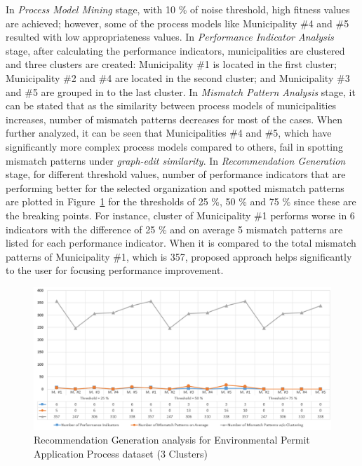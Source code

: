 In \textit{Process Model Mining} stage, with 10 \% of noise threshold, high fitness values are achieved; however, some of the process models like Municipality \#4 and \#5 resulted with low appropriateness values. In \textit{Performance Indicator Analysis} stage, after calculating the performance indicators, municipalities are clustered and three clusters are created: Municipality \#1 is located in the first cluster; Municipality \#2 and \#4 are located in the second cluster; and Municipality \#3 and \#5 are grouped in to the last cluster. In \textit{Mismatch Pattern Analysis} stage, it can be stated that as the similarity between process models of municipalities increases, number of mismatch patterns decreases for most of the cases. When further analyzed, it can be seen that Municipalities \#4 and \#5, which have significantly more complex process models compared to others, fail in spotting mismatch patterns under \textit{graph-edit similarity}. In \textit{Recommendation Generation} stage, for different threshold values, number of performance indicators that are performing better for the selected organization and spotted mismatch patterns are plotted in Figure~\ref{fig:coselog-wabo-recommendation-generation-analysis} for the thresholds of 25 \%, 50 \% and 75 \% since these are the breaking points. For instance, cluster of Municipality \#1 performs worse in 6 indicators with the difference of 25 \% and on average 5 mismatch patterns are listed for each performance indicator. When it is compared to the total mismatch patterns of Municipality \#1, which is 357, proposed approach helps significantly to the user for focusing performance improvement.
\begin{figure}
	\centering
	\includegraphics[width=\textwidth]{5_results_discussions/coselog-wabo/recommendation-generation-analysis-k3}
	\caption{Recommendation Generation analysis for Environmental Permit Application Process dataset (3 Clusters)}
  	\label{fig:coselog-wabo-recommendation-generation-analysis}
\end{figure}
